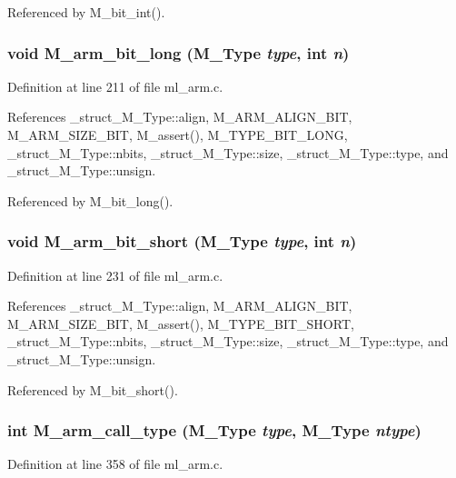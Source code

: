 Referenced by M\_\-bit\_\-int().
\subsubsection{\setlength{\rightskip}{0pt plus 5cm}void M\_\-arm\_\-bit\_\-long (\bf{M\_\-Type} {\em type}, int {\em n})}\label{ml__arm_8c_777a9ef47b52fc1c01340408ddc629cb}




Definition at line 211 of file ml\_\-arm.c.

References \_\-struct\_\-M\_\-Type::align, M\_\-ARM\_\-ALIGN\_\-BIT, M\_\-ARM\_\-SIZE\_\-BIT, M\_\-assert(), M\_\-TYPE\_\-BIT\_\-LONG, \_\-struct\_\-M\_\-Type::nbits, \_\-struct\_\-M\_\-Type::size, \_\-struct\_\-M\_\-Type::type, and \_\-struct\_\-M\_\-Type::unsign.

Referenced by M\_\-bit\_\-long().
\subsubsection{\setlength{\rightskip}{0pt plus 5cm}void M\_\-arm\_\-bit\_\-short (\bf{M\_\-Type} {\em type}, int {\em n})}\label{ml__arm_8c_18a47ead648da366e30fe84268a9b624}




Definition at line 231 of file ml\_\-arm.c.

References \_\-struct\_\-M\_\-Type::align, M\_\-ARM\_\-ALIGN\_\-BIT, M\_\-ARM\_\-SIZE\_\-BIT, M\_\-assert(), M\_\-TYPE\_\-BIT\_\-SHORT, \_\-struct\_\-M\_\-Type::nbits, \_\-struct\_\-M\_\-Type::size, \_\-struct\_\-M\_\-Type::type, and \_\-struct\_\-M\_\-Type::unsign.

Referenced by M\_\-bit\_\-short().
\subsubsection{\setlength{\rightskip}{0pt plus 5cm}int M\_\-arm\_\-call\_\-type (\bf{M\_\-Type} {\em type}, \bf{M\_\-Type} {\em ntype})}\label{ml__arm_8c_470a962d166d8fd454e315f3ca9ad5c1}




Definition at line 358 of file ml\_\-arm.c.

